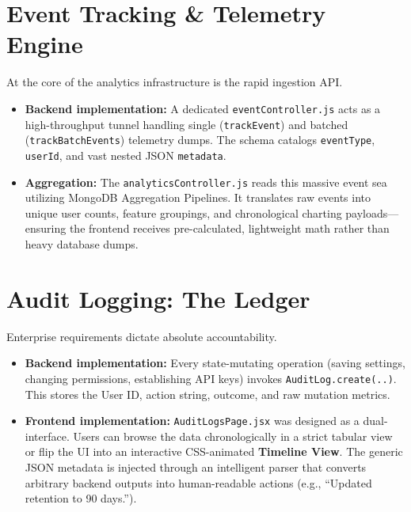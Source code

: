 \documentclass[12pt,a4paper]{report}
\begin{document}
\section{Event Tracking \& Telemetry Engine}
At the core of the analytics infrastructure is the rapid ingestion API.
\begin{itemize}
    \item \textbf{Backend implementation:} A dedicated \texttt{eventController.js} acts as a high-throughput tunnel handling single (\texttt{trackEvent}) and batched (\texttt{trackBatchEvents}) telemetry dumps. The schema catalogs \texttt{eventType}, \texttt{userId}, and vast nested JSON \texttt{metadata}.
    \item \textbf{Aggregation:} The \texttt{analyticsController.js} reads this massive event sea utilizing MongoDB Aggregation Pipelines. It translates raw events into unique user counts, feature groupings, and chronological charting payloads—ensuring the frontend receives pre-calculated, lightweight math rather than heavy database dumps.
\end{itemize}

\section{Audit Logging: The Ledger}
Enterprise requirements dictate absolute accountability.
\begin{itemize}
    \item \textbf{Backend implementation:} Every state-mutating operation (saving settings, changing permissions, establishing API keys) invokes \texttt{AuditLog.create(..)}. This stores the User ID, action string, outcome, and raw mutation metrics.
    \item \textbf{Frontend implementation:} \texttt{AuditLogsPage.jsx} was designed as a dual-interface. Users can browse the data chronologically in a strict tabular view or flip the UI into an interactive CSS-animated \textbf{Timeline View}. The generic JSON metadata is injected through an intelligent parser that converts arbitrary backend outputs into human-readable actions (e.g., ``Updated retention to 90 days.'').
\end{itemize}
\end{document}
